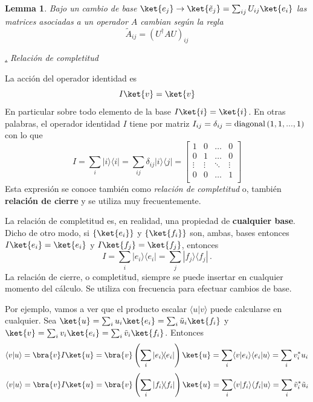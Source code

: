 \documentclass[a4paper,11pt]{book} %
\newtheorem{lemma_contador}{Lemma}
\newcommand{\Lemma}[1]{
		\begin{mybox_gray2}{}
			\begin{lemma_contador}
				 #1 
			\end{lemma_contador} 
		\end{mybox_gray2}
	}
\numberwithin{equation}{chapter}
\newcommand{\braket}[2]{\langle #1|#2\rangle}
\newcommand{\ketbra}[2]{| #1\rangle \! \langle #2|}
\def\subsubiContadorIt{\par\addtocounter{subsubsection}{1}\underline{\it\thesubsubsection.}\hskip0.5cm \setcounter{subsubsubsectionIt}{0}}
\newcommand{\SubsubiIt}[1]{
		\subsubiContadorIt \textit{#1}
	}
\newcounter{subsubsubsectionIt}[subsubsection]
\begin{document}
	\Lemma{
	Bajo un cambio de base $ \ket{e_j} \to \ket{\tilde e_j} = \sum_{ij}U_{ij} \ket{e_i}$ las matrices
asociadas a un operador $A$ cambian según la regla
	\begin{equation}
	\tilde A_{ij} = (U^\dagger A U)_{ij}
	\end{equation}
	}
			\SubsubiIt{Relación de completitud}

La acción del operador identidad es 
	\begin{equation}
I\ket{v} = \ket{v}
	\end{equation}
En particular sobre todo elemento de la base $I\ket{i} = \ket{i}$. En otras palabras,
el operador identidad $I$ tiene por matriz $I_{ij}=\delta_{ij}={\rm diagonal}\, (1,1,...,1)$ con lo que
	\begin{equation}
	\boxed{ I = \sum_{i}  \ketbra{i}{i} } = \sum_{ij} \delta_{ij}\ketbra{i}{j} = 
	\begin{bmatrix}
	1 & 0 & \dots & 0 \\
	0 & 1 & \dots & 0 \\
	\vdots & \vdots & \ddots & \vdots \\
	0 & 0 & \dots & 1 \\
	\end{bmatrix}
	\end{equation}
Esta expresión se conoce también como \textit{relación de completitud} o, también \textbf{relación de cierre} y se utiliza muy frecuentemente.

La relación de completitud es, en realidad, una propiedad de  \textbf{cualquier base}. Dicho de otro modo, si $\{\ket{e_i}\}$ y $\{\ket{f_i}\}$ son, ambas, bases entonces $I\ket{e_i} = \ket{e_ i}$ y $I\ket{f_j} = \ket{f_j}$, entonces 
	\begin{equation}
I =  \sum_{i}  \ketbra{e_i}{e_i} =  \sum_{j}  \ketbra{f_j}{f_j}\, .
	\end{equation}
La relación de cierre, o completitud,  siempre se puede insertar en cualquier momento del cálculo. Se utiliza con frecuencia para efectuar cambios de base.

Por ejemplo, vamos a ver que el producto escalar $\braket{u}{v}$ puede calcularse en cualquier. 
Sea $\ket{u} = \sum_i u_i\ket{e_i} = \sum_i \tilde u_i \ket{f_i}$  y $\ket{v} = \sum_i  v_i\ket{e_i}=\sum_i \tilde v_i\ket{f_i}$. Entonces
	\begin{equation}
\braket{v}{u} = \bra{v} I \ket{u} = \bra{v}\left(\sum_i\ketbra{e_i}{e_i}\right)\ket{u} = 
\sum_i \braket{v}{e_i}\braket{e_i}{u} = \sum_i v_i^* u_i
	\end{equation}
	\begin{equation}
\braket{v}{u} = \bra{v} I \ket{u} = \bra{v}\left(\sum_i\ketbra{f_i}{f_i}\right)\ket{u} = 
\sum_i \braket{v}{f_i}\braket{f_i}{u} = \sum_i \tilde v_i^* \tilde u_i
	\end{equation}
\end{document}
